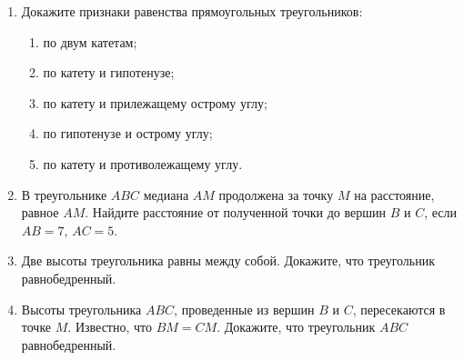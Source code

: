 \documentclass[12pt, a4paper]{article}
\begin{document}
		

\begin{enumerate}
	\item Докажите признаки равенства прямоугольных треугольников:
	\begin{enumerate}[label=\asbuk*)]
		\item по двум катетам;
		\item по катету и гипотенузе;
		\item по катету и прилежащему острому углу;
		\item по гипотенузе и острому углу;
		\item по катету и противолежащему углу.
	\end{enumerate}
	\item В треугольнике $ABC$ медиана $AM$ продолжена за точку $M$ на расстояние, равное $AM$. Найдите расстояние от полученной точки до вершин $B$ и $C$, если $AB = 7$, $AC = 5$.
	\item Две высоты треугольника равны между собой. Докажите, что треугольник равнобедренный.
	\item Высоты треугольника $ABC$, проведенные из вершин $B$ и $C$, пересекаются в точке $M$. Известно, что $BM = CM$. Докажите, что треугольник $ABC$ равнобедренный.
	
	\end{enumerate}
\end{document}
